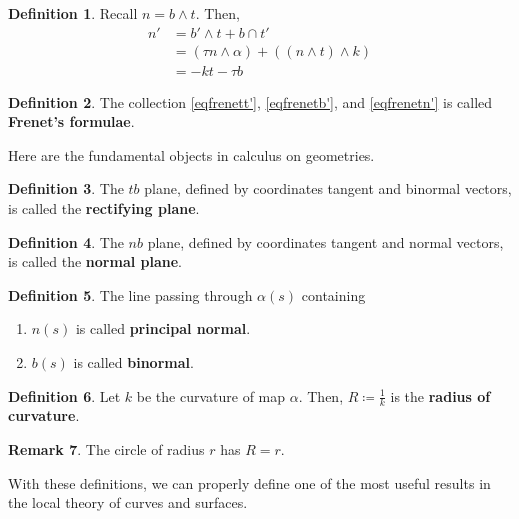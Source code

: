\documentclass{amsart} %
\theoremstyle{mytheoremstyle}
\theoremstyle{definition}
\newtheorem{definition}{Definition}[section]
\newtheorem{remark}[definition]{Remark}
\numberwithin{equation}{section}
\DeclareMathOperator{\1}{\mathbbm{1}}
\begin{document}
\begin{definition}
	\label{deffrenetn'}
	Recall $n = b \wedge t$. Then,
	\begin{align}
		\nonumber n' &= b' \wedge t + b \cap t' \\
		\nonumber &= (\tau n \wedge \alpha) + ( (n \wedge t) \wedge k ) \\
		\label{eqfrenetn'} &= - kt - \tau b
	\end{align}
\end{definition}


\begin{definition}
	\label{deffrenetformula}
	The collection \eqref{eqfrenett'}, \eqref{eqfrenetb'}, and \eqref{eqfrenetn'} is called \textbf{Frenet's formulae}.
\end{definition}


Here are the fundamental objects in calculus on geometries.

\begin{definition}
	\label{defrectifyingplane}
	The $tb$ plane, defined by coordinates tangent and binormal vectors, is called the \textbf{rectifying plane}.
\end{definition}

\begin{definition}
	\label{defnormalplane}
	The $nb$ plane, defined by coordinates tangent and normal vectors, is called the \textbf{normal plane}.
\end{definition}

\begin{definition}
	\label{defprincipalnormalandbinormalplanes}
	The line passing through $\alpha(s)$ containing
	\begin{enumerate}
		\item $n(s)$ is called \textbf{principal normal}.
		\item $b(s)$ is called \textbf{binormal}.
	\end{enumerate}
\end{definition}

\begin{definition}
	\label{defradiusofcurvature}
	Let $k$ be the curvature of map $\alpha$. Then, $R \coloneqq \frac{1}{k}$ is the \textbf{radius of curvature}.
\end{definition}

\begin{remark}
	The circle of radius $r$ has $R = r$.
\end{remark}

With these definitions, we can properly define one of the most useful results in the local theory of curves and surfaces.
\end{document}
